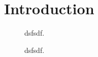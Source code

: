 \section{Introduction}
\lipsum[5]

\begin{figure}[h]
	\centering
    
	\caption{dsfsdf.}
	\label{fig:bat_discharge}
\end{figure}

\begin{figure}[h]
	\centering
    
	\caption{dsfsdf.}
	\label{fig:bat_discharge}
\end{figure}